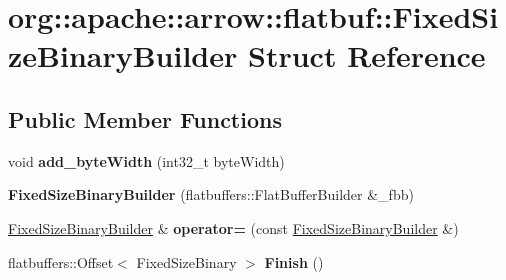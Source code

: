 \hypertarget{structorg_1_1apache_1_1arrow_1_1flatbuf_1_1FixedSizeBinaryBuilder}{}\section{org\+:\+:apache\+:\+:arrow\+:\+:flatbuf\+:\+:Fixed\+Size\+Binary\+Builder Struct Reference}
\label{structorg_1_1apache_1_1arrow_1_1flatbuf_1_1FixedSizeBinaryBuilder}
\subsection*{Public Member Functions}
\begin{DoxyCompactItemize}
\item 
void {\bfseries add\+\_\+byte\+Width} (int32\+\_\+t byte\+Width)\hypertarget{structorg_1_1apache_1_1arrow_1_1flatbuf_1_1FixedSizeBinaryBuilder_a21951861aca0f99afcbeabc665608537}{}\label{structorg_1_1apache_1_1arrow_1_1flatbuf_1_1FixedSizeBinaryBuilder_a21951861aca0f99afcbeabc665608537}

\item 
{\bfseries Fixed\+Size\+Binary\+Builder} (flatbuffers\+::\+Flat\+Buffer\+Builder \&\+\_\+fbb)\hypertarget{structorg_1_1apache_1_1arrow_1_1flatbuf_1_1FixedSizeBinaryBuilder_ab4de5f85b7bf2cee93cf82e97c560297}{}\label{structorg_1_1apache_1_1arrow_1_1flatbuf_1_1FixedSizeBinaryBuilder_ab4de5f85b7bf2cee93cf82e97c560297}

\item 
\hyperlink{structorg_1_1apache_1_1arrow_1_1flatbuf_1_1FixedSizeBinaryBuilder}{Fixed\+Size\+Binary\+Builder} \& {\bfseries operator=} (const \hyperlink{structorg_1_1apache_1_1arrow_1_1flatbuf_1_1FixedSizeBinaryBuilder}{Fixed\+Size\+Binary\+Builder} \&)\hypertarget{structorg_1_1apache_1_1arrow_1_1flatbuf_1_1FixedSizeBinaryBuilder_a7cfae325e0854255c7cd07cd3356ada5}{}\label{structorg_1_1apache_1_1arrow_1_1flatbuf_1_1FixedSizeBinaryBuilder_a7cfae325e0854255c7cd07cd3356ada5}

\item 
flatbuffers\+::\+Offset$<$ Fixed\+Size\+Binary $>$ {\bfseries Finish} ()\hypertarget{structorg_1_1apache_1_1arrow_1_1flatbuf_1_1FixedSizeBinaryBuilder_a4705cc4da219e267c3a6461783130f50}{}\label{structorg_1_1apache_1_1arrow_1_1flatbuf_1_1FixedSizeBinaryBuilder_a4705cc4da219e267c3a6461783130f50}

\end{DoxyCompactItemize}
